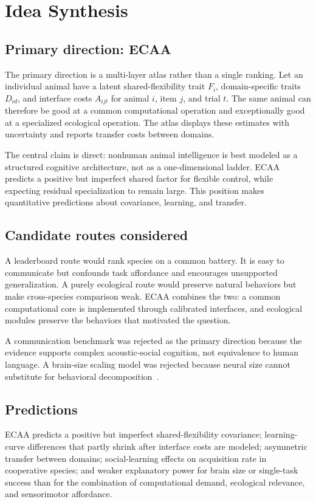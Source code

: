 \documentclass[conference]{IEEEtran}
\begin{document}
\section{Idea Synthesis}
\subsection{Primary direction: ECAA}
The primary direction is a multi-layer atlas rather than a single ranking. Let an individual animal have a latent shared-flexibility trait $F_i$, domain-specific traits $D_{id}$, and interface costs $A_{ijt}$ for animal $i$, item $j$, and trial $t$. The same animal can therefore be good at a common computational operation and exceptionally good at a specialized ecological operation. The atlas displays these estimates with uncertainty and reports transfer costs between domains.

The central claim is direct: nonhuman animal intelligence is best modeled as a structured cognitive architecture, not as a one-dimensional ladder. ECAA predicts a positive but imperfect shared factor for flexible control, while expecting residual specialization to remain large. This position makes quantitative predictions about covariance, learning, and transfer.

\subsection{Candidate routes considered}
A leaderboard route would rank species on a common battery. It is easy to communicate but confounds task affordance and encourages unsupported generalization. A purely ecological route would preserve natural behaviors but make cross-species comparison weak. ECAA combines the two: a common computational core is implemented through calibrated interfaces, and ecological modules preserve the behaviors that motivated the question.

A communication benchmark was rejected as the primary direction because the evidence supports complex acoustic-social cognition, not equivalence to human language. A brain-size scaling model was rejected because neural size cannot substitute for behavioral decomposition~\cite{marino2007}.

\subsection{Predictions}
ECAA predicts a positive but imperfect shared-flexibility covariance; learning-curve differences that partly shrink after interface costs are modeled; asymmetric transfer between domains; social-learning effects on acquisition rate in cooperative species; and weaker explanatory power for brain size or single-task success than for the combination of computational demand, ecological relevance, and sensorimotor affordance.
\end{document}
